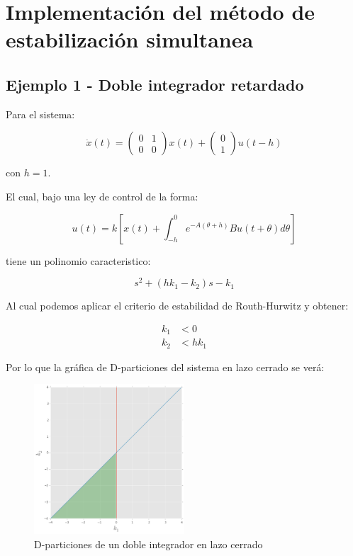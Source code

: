 \documentclass{article}
\begin{document}
    \section{Implementación del método de estabilización
simultanea}\label{implementaciuxf3n-del-muxe9todo-de-estabilizaciuxf3n-simultanea}

    \subsection{Ejemplo 1 - Doble integrador
retardado}\label{ejemplo-1---doble-integrador-retardado}

    Para el sistema:

\[
\dot{x}(t) =
\begin{pmatrix}
0 & 1 \\
0 & 0
\end{pmatrix}
x(t) +
\begin{pmatrix}
0 \\
1
\end{pmatrix}
u(t - h)
\]

con \(h = 1\).

    El cual, bajo una ley de control de la forma:

\[
u(t) = k \left[ x(t) + \int_{-h}^0 e^{-A(\theta + h)} B u(t + \theta) d\theta \right]
\]

tiene un polinomio caracteristico:

\[
s^2 +  \left( h k_1 - k_2 \right) s - k_1
\]

Al cual podemos aplicar el criterio de estabilidad de Routh-Hurwitz y
obtener:

\[
\begin{align}
k_1 &< 0 \\
k_2 &< h k_1
\end{align}
\]

Por lo que la gráfica de D-particiones del sistema en lazo cerrado se
verá:

\begin{figure}[htbp]
\centering
\includegraphics[width=0.5\textwidth]{../imagenes/dobintlc.png}
\caption{D-particiones de un doble integrador en lazo cerrado}
\end{figure}
\end{document}
